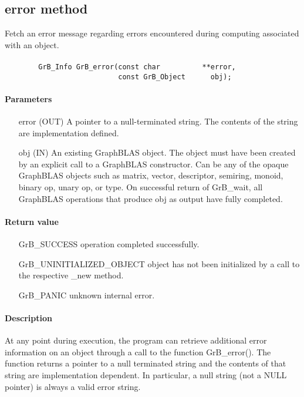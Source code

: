 \subsection{{\sf error} method}
\label{Sec:GrB_error}

Fetch an error message regarding errors encountered during computing associated with an object.

\paragraph{\syntax}

\begin{verbatim}
        GrB_Info GrB_error(const char          **error,
                           const GrB_Object      obj);
\end{verbatim}

\paragraph{Parameters}

\begin{itemize}[leftmargin=1.1in]
	\item[{\sf error}] ({\sf OUT}) A pointer to a null-terminated
		string. The contents of the string are implementation
		defined.

        \item[{\sf obj}] ({\sf IN}) An existing GraphBLAS object.
        The object must have been created by an explicit call to a
        GraphBLAS constructor.  Can be any of the opaque GraphBLAS
        objects such as matrix, vector, descriptor, semiring, monoid,
        binary op, unary op, or type. On successful return of {\sf
        GrB\_wait}, all GraphBLAS operations that produce {\sf obj}
        as output have fully completed.
\end{itemize}


\paragraph{Return value}
\begin{itemize}[leftmargin=2.3in]
	\item[{\sf GrB\_SUCCESS}]			operation completed successfully.
	\item[{\sf GrB\_UNINITIALIZED\_OBJECT}]		object has not been initialized by a call to the respective {\sf *\_new} method.
	\item[{\sf GrB\_PANIC}]				unknown internal error.
\end{itemize}

\paragraph{Description}


At any point during execution, the program can retrieve additional
error information on an object through a
call to the function {\sf GrB\_error()}. 
The function returns a pointer to a null terminated string and the contents of that string
are implementation dependent. In particular, a null string (not a {\sf NULL} pointer) is always a valid error string.



